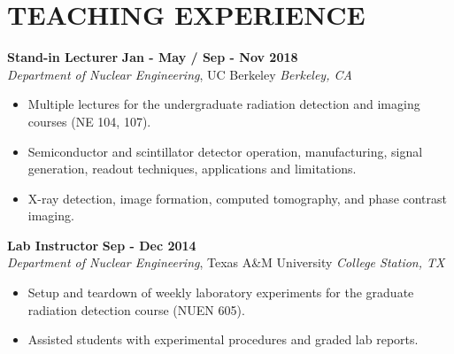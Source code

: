 \section{\small{TEACHING EXPERIENCE}}

\textbf{Stand-in Lecturer} \hfill \textbf{Jan - May / Sep - Nov 2018} \\
\textsl{Department of Nuclear Engineering}, UC Berkeley \hfill \textsl{Berkeley, CA}\\[-2.8ex]
\vspace{2pt}
\begin{itemize}[leftmargin=4ex] \itemsep -2pt
    \item Multiple lectures for the undergraduate radiation detection and imaging courses (NE 104, 107).
    \item Semiconductor and scintillator detector operation, manufacturing, signal generation, readout techniques, applications and limitations.
    \item X-ray detection, image formation, computed tomography, and phase contrast imaging.
\end{itemize}

\textbf{Lab Instructor} \hfill \textbf{Sep - Dec 2014} \\
\textsl{Department of Nuclear Engineering}, Texas A\&M University \hfill \textsl{College Station, TX}\\[-2.8ex]
\vspace{2pt}
\begin{itemize}[leftmargin=4ex] \itemsep -2pt
    \item Setup and teardown of weekly laboratory experiments for the graduate radiation detection course (NUEN 605).
    \item Assisted students with experimental procedures and graded lab reports.
\end{itemize}

